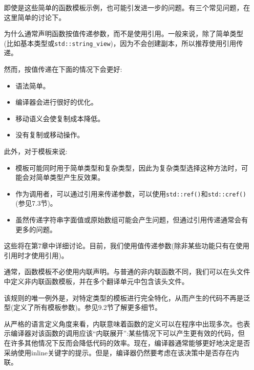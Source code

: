 即使是这些简单的函数模板示例，也可能引发进一步的问题。有三个常见问题，在这里简单的讨论下。


为什么通常声明函数按值传递参数，而不是使用引用。一般来说，除了简单类型(比如基本类型或\texttt{std::string\_view})，因为不会创建副本，所以推荐使用引用传递。

然而，按值传递在下面的情况下会更好:

\begin{itemize}
\item
语法简单。

\item 
编译器会进行很好的优化。

\item
移动语义会使复制成本降低。

\item 
没有复制或移动操作。
\end{itemize}

此外，对于模板来说:

\begin{itemize}
\item
模板可能同时用于简单类型和复杂类型，因此为复杂类型选择这种方法时，可能会对简单类型产生反效果。

\item 
作为调用者，可以通过引用来传递参数，可以使用\texttt{std::ref()}和\texttt{std::cref()}(参见7.3节)。

\item
虽然传递字符串字面值或原始数组可能会产生问题，但通过引用传递通常会有更多的问题。
\end{itemize}

这些将在第7章中详细讨论。目前，我们使用值传递参数(除非某些功能只有在使用引用时才使用引用)。

 
通常，函数模板不必使用内联声明。与普通的非内联函数不同，我们可以在头文件中定义非内联函数模板，并在多个翻译单元中包含该头文件。

该规则的唯一例外是，对特定类型的模板进行完全特化，从而产生的代码不再是泛型(定义了所有模板参数)。参见9.2节了解更多细节。
 
从严格的语言定义角度来看，内联意味着函数的定义可以在程序中出现多次。也表示编译器对该函数的调用应该“内联展开”:某些情况下可以产生更有效的代码，但在许多其他情况下反而会降低代码的效率。现在，编译器通常能够更好地决定是否采纳使用inline关键字的提示。但是，编译器仍然要考虑在该决策中是否存在内联。

